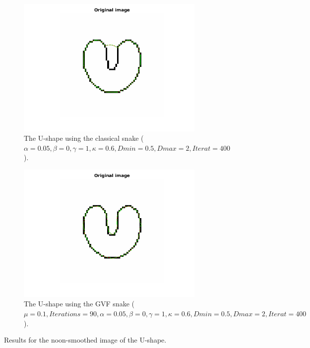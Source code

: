 \documentclass{article}
\begin{document}
\begin{figure}
\centering
\begin{subfigure}{0.49\textwidth}
  \centering
  \includegraphics[width=\linewidth]{fig1.png}
  \caption{The U-shape using the classical snake ($\alpha=0.05, \beta=0, \gamma=1,\kappa=0.6,Dmin=0.5,Dmax=2,Iterat=400$).}
  \label{fig1a}
\end{subfigure}
\begin{subfigure}{0.49\textwidth}
  \centering
  \includegraphics[width=\linewidth]{fig2.png}
  \caption{The U-shape using the GVF snake ($\mu=0.1, Iterations=90, \alpha=0.05, \beta=0, \gamma=1,\kappa=0.6,Dmin=0.5,Dmax=2,Iterat=400$).}
  \label{fig1b}
\end{subfigure}
\caption{Results for the noon-smoothed image of the U-shape.}
\end{figure}
\end{document}
